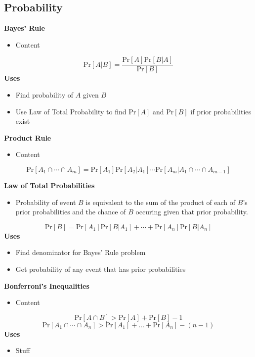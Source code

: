 \documentclass{article}\usepackage{amsmath,amssymb,amsthm,tikz,tkz-graph,color,chngpage,soul,hyperref,csquotes,graphicx,floatrow, listings,polynom}\newcommand*{\QEDB}{\hfill\ensuremath{\square}}\newtheorem*{prop}{Proposition}\renewcommand{\theenumi}{\alph{enumi}}\usepackage[shortlabels]{enumitem}\usepackage[nobreak=true]{mdframed}\usetikzlibrary{matrix,calc}\MakeOuterQuote{"}\usepackage[margin=0.75in]{geometry} \newtheorem{theorem}{Theorem}\newcommand{\Z}{\mathbb Z}\newcommand{\R}{\mathbb R}\newcommand{\Q}{\mathbb Q}\newcommand{\N}{\mathbb N}\newcommand{\x}[1]{\textrm{ #1 }}\newcommand{\pr}{\textrm{Pr}}
\newcommand{\eq}[1]{\begin{equation}#1\end{equation}}
\begin{document}
\subsection*{Probability}
\textbf{Bayes' Rule}
\begin{itemize}
    \item Content
\end{itemize}
\begin{mdframed}
\eq{\pr[A|B]=\frac{\pr[A]\pr[B|A]}{\pr[B]}}
\textbf{Uses}
\begin{itemize}
    \item Find probability of $A$ given $B$
    \item Use Law of Total Probability to find $\pr[A]$ and $\pr[B]$ if prior probabilities exist
\end{itemize}
\end{mdframed}
\textbf{Product Rule}
\begin{itemize}
    \item Content
\end{itemize}
\begin{mdframed}
\eq{\pr[A_1\cap\cdots\cap A_m]=\pr[A_1]\pr[A_2|A_1]\cdots\pr[A_m|A_1\cap\cdots\cap A_{m-1}]}
\end{mdframed}
\textbf{Law of Total Probabilities}
\begin{itemize}
    \item Probability of event $B$ is equivalent to the sum of the product of each of $B$'s prior probabilities and the chance of $B$ occuring given that prior probability.
\end{itemize}
\begin{mdframed}
\eq{\pr[B]=\pr[A_1]\pr[B|A_1]+\cdots+\pr[A_n]\pr[B|A_n]}
\textbf{Uses}
\begin{itemize}
    \item Find denominator for Bayes' Rule problem
    \item Get probability of any event that has prior probabilities
\end{itemize}
\end{mdframed}
\textbf{Bonferroni's Inequalities}
\begin{itemize}
    \item Content
\end{itemize}
\begin{mdframed}
\eq{\pr[A \cap B] > \pr[A] + \pr[B] - 1}
\eq{\pr[A_1 \cap\cdots\cap A_n] > \pr[A_1] + . . . + \pr[A_n] - (n - 1)}
\textbf{Uses}
\begin{itemize}
    \item Stuff
\end{itemize}
\end{mdframed}
\end{document}
